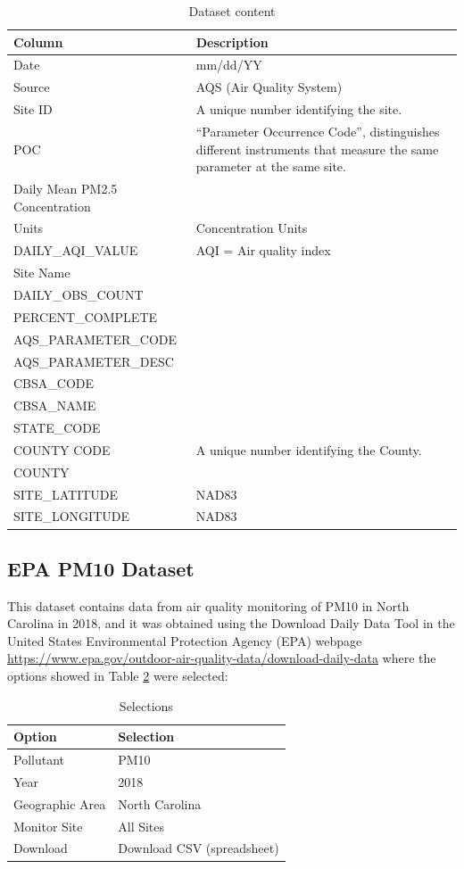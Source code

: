 \documentclass[12pt,]{article}
\begin{document}
\begin{table}[ht]
\centering
\begin{tabular}{p{2.5in}p{3.5in}}
  \hline
Column & Description \\ 
  \hline
Date & mm/dd/YY \\ 
  Source & AQS (Air Quality System) \\ 
  Site ID & A unique number identifying the site. \\ 
  POC & “Parameter Occurrence Code”, distinguishes different instruments that measure the same parameter at the same site. \\ 
  Daily Mean PM2.5 Concentration &  \\ 
  Units & Concentration Units \\ 
  DAILY\_AQI\_VALUE & AQI = Air quality index \\ 
  Site Name &  \\ 
  DAILY\_OBS\_COUNT &  \\ 
  PERCENT\_COMPLETE &  \\ 
  AQS\_PARAMETER\_CODE &  \\ 
  AQS\_PARAMETER\_DESC &  \\ 
  CBSA\_CODE &  \\ 
  CBSA\_NAME &  \\ 
  STATE\_CODE &  \\ 
  COUNTY CODE & A unique number identifying the County. \\ 
  COUNTY &  \\ 
  SITE\_LATITUDE & NAD83 \\ 
  SITE\_LONGITUDE & NAD83 \\ 
   \hline
\end{tabular}
\caption{Dataset content} 
\label{tab:tab3}
\end{table}

\subsection{EPA PM10 Dataset}\label{epa-pm10-dataset}

This dataset contains data from air quality monitoring of PM10 in North
Carolina in 2018, and it was obtained using the Download Daily Data Tool
in the United States Environmental Protection Agency (EPA) webpage
\url{https://www.epa.gov/outdoor-air-quality-data/download-daily-data}
where the options showed in Table \ref{tab:tab4} were selected:

\begin{table}[ht]
\centering
\begin{tabular}{ll}
  \hline
Option & Selection \\ 
  \hline
Pollutant & PM10 \\ 
  Year & 2018 \\ 
  Geographic Area & North Carolina \\ 
  Monitor Site & All Sites \\ 
  Download & Download CSV (spreadsheet) \\ 
   \hline
\end{tabular}
\caption{Selections} 
\label{tab:tab4}
\end{table}
\end{document}
